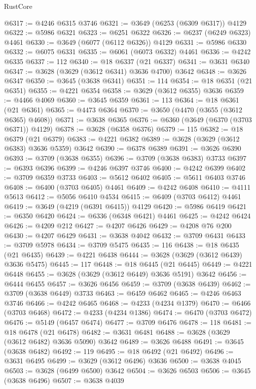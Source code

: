 \begin{lexlean}{RustCore}
\begin{coremodule}
@6317 := @4246 @6315 @3746
@6321 := @3649 (@6253 (@6309 @6317)) @4129
@6322 := @5986 @6321
@6323 := @6251 @6322
@6326 := @6237 (@6249 @6323) @4461
@6330 := @3649 (@6077 (@6112 @6326)) @4129
@6331 := @5986 @6330
@6332 := @6075 @6331
@6335 := @6061 (@6073 @6332) @4461
@6336 := @4242 @6335
@6337 := 112
@6340 := @18 @6337 (@21 @6337)
@6341 := @3631 @6340
@6347 := @3628 (@3629 (@3612 @6341) @3636 @4700) @3642
@6348 := @3626 @6347
@6350 := @3645 (@3638 @6341)
@6351 := 114
@6354 := @18 @6351 (@21 @6351)
@6355 := @4221 @6354
@6358 := @3629 (@3612 @6355) @3636
@6359 := @4466 @4069
@6360 := @3645 @6359
@6361 := 113
@6364 := @18 @6361 (@21 @6361)
@6365 := @4473 @6364
@6370 := @3650 (@4470 (@3655 (@3612 @6365) @4608))
@6371 := @3638 @6365
@6376 := @6360 (@3649 (@6370 (@3703 @6371)) @4129)
@6378 := @3628 (@6358 @6376)
@6379 := 115
@6382 := @18 @6379 (@21 @6379)
@6383 := @4221 @6382
@6389 := @3628 (@3629 (@3612 @6383) @3636 @5359) @3642
@6390 := @6378 @6389
@6391 := @3626 @6390
@6393 := @3709 (@3638 @6355)
@6396 := @3709 (@3638 @6383) @3733
@6397 := @6393 @6396
@6399 := @4246 @6397 @3746
@6400 := @4242 @6399
@6402 := @3709 @6359 @3733
@6403 := @5612 @6402
@6405 := @5611 @6403 @3746
@6408 := @6400 (@3703 @6405) @4461
@6409 := @4242 @6408
@6410 := @4111 @5613
@6412 := @5056 @6410 @4534
@6415 := @6409 (@3703 @6412) @4461
@6419 := @3649 (@4219 (@6391 @6415)) @4129
@6420 := @5986 @6419
@6421 := @6350 @6420
@6424 := @6336 (@6348 @6421) @4461
@6425 := @4242 @6424
@6426 := @4209 @212
@6427 := @4207 @6426
@6429 := @4208 @76 @200
@6430 := @4207 @6429
@6431 := @3638 @4042
@6432 := @3709 @6431
@6433 := @3709 @5978
@6434 := @3709 @5475
@6435 := 116
@6438 := @18 @6435 (@21 @6435)
@6439 := @4221 @6438
@6444 := @3628 (@3629 (@3612 @6439) @3636 @5475)
@6445 := 117
@6448 := @18 @6445 (@21 @6445)
@6449 := @4221 @6448
@6455 := @3628 (@3629 (@3612 @6449) @3636 @5191) @3642
@6456 := @6444 @6455
@6457 := @3626 @6456
@6459 := @3709 (@3638 @6439)
@6462 := @3709 (@3638 @6449) @3733
@6463 := @6459 @6462
@6465 := @4246 @6463 @3746
@6466 := @4242 @6465
@6468 := @4233 (@4234 @1379)
@6470 := @6466 (@3703 @6468)
@6472 := @4233 (@4234 @1386)
@6474 := @6470 (@3703 @6472)
@6476 := @5149 (@6457 @6474)
@6477 := @3709 @6476
@6478 := 118
@6481 := @18 @6478 (@21 @6478)
@6482 := @3631 @6481
@6488 := @3628 (@3629 (@3612 @6482) @3636 @5090) @3642
@6489 := @3626 @6488
@6491 := @3645 (@3638 @6482)
@6492 := 119
@6495 := @18 @6492 (@21 @6492)
@6496 := @3631 @6495
@6499 := @3629 (@3612 @6496) @3636
@6500 := @3638 @4045
@6503 := @3628 (@6499 @6500) @3642
@6504 := @3626 @6503
@6506 := @3645 (@3638 @6496)
@6507 := @3638 @4039

\end{coremodule}
\end{lexlean}
